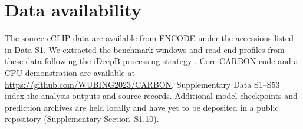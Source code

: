 \documentclass[webpdf,contemporary,large]{current_assets/oup-authoring-template}
\newcommand{\supsect}[1]{Supplementary Section~#1}
\begin{document}
\section*{Data availability}

The source eCLIP data are available from ENCODE under the accessions listed in Data S1. We extracted the benchmark windows and read-end profiles from these data following the iDeepB processing strategy \citep{liu2025ideepb}. Core CARBON code and a CPU demonstration are available at \url{https://github.com/WUBING2023/CARBON}. Supplementary Data S1--S53 index the analysis outputs and source records. Additional model checkpoints and prediction archives are held locally and have yet to be deposited in a public repository (\supsect{S1.10}).

{\small}
\end{document}
